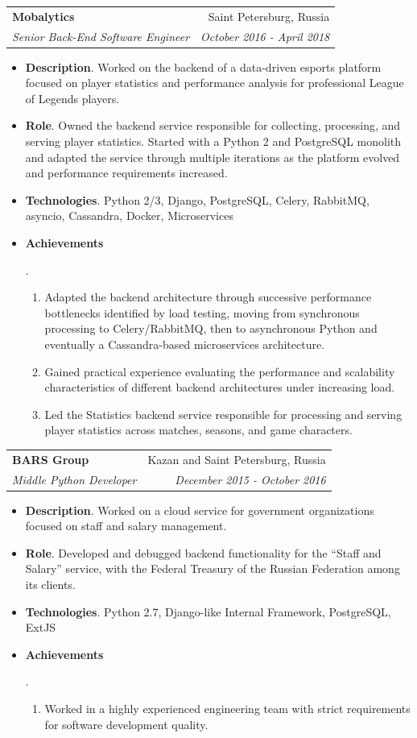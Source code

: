 \documentclass[letterpaper,11pt]{article}
\makeatletter
\newcommand{\resumeItem}[2]{
  \item\small{
    \textbf{#1}{. #2 \vspace{-2pt}}
  }
}
\newcommand{\resumeSubheading}[4]{
  \vspace{-1pt}\item
    \begin{tabular*}{0.97\textwidth}{l@{\extracolsep{\fill}}r}
      \textbf{#1} & #2 \\
      \textit{\small#3} & \textit{\small #4} \\
    \end{tabular*}\vspace{-5pt}
}
\newcommand{\resumeItemListStart}{\begin{itemize}}
\newcommand{\resumeItemListEnd}{\end{itemize}\vspace{-5pt}}
\makeatother
\begin{document}
    \resumeSubheading
      {Mobalytics}{Saint Petersburg, Russia}
      {Senior Back-End Software Engineer}{October 2016 - April 2018}
      \resumeItemListStart
        \resumeItem{Description}
          {Worked on the backend of a data-driven esports platform focused on player statistics and performance analysis for professional League of Legends players.}
        \resumeItem{Role}
          {Owned the backend service responsible for collecting, processing, and serving player statistics. Started with a Python 2 and PostgreSQL monolith and adapted the service through multiple iterations as the platform evolved and performance requirements increased.}
        \resumeItem{Technologies}
          {Python 2/3, Django, PostgreSQL, Celery, RabbitMQ, asyncio, Cassandra, Docker, Microservices}
        \resumeItem{Achievements}
          {
            \begin{enumerate}
              \item Adapted the backend architecture through successive performance bottlenecks identified by load testing, moving from synchronous processing to Celery/RabbitMQ, then to asynchronous Python and eventually a Cassandra-based microservices architecture.
              \item Gained practical experience evaluating the performance and scalability characteristics of different backend architectures under increasing load.
              \item Led the Statistics backend service responsible for processing and serving player statistics across matches, seasons, and game characters.
            \end{enumerate}
          }
      \resumeItemListEnd

      \resumeSubheading
      {BARS Group}{Kazan and Saint Petersburg, Russia}
      {Middle Python Developer}{December 2015 - October 2016}
      \resumeItemListStart
        \resumeItem{Description}
          {Worked on a cloud service for government organizations focused on staff and salary management.}
        \resumeItem{Role}
          {Developed and debugged backend functionality for the ``Staff and Salary'' service, with the Federal Treasury of the Russian Federation among its clients.}
        \resumeItem{Technologies}
          {Python 2.7, Django-like Internal Framework, PostgreSQL, ExtJS}
        \resumeItem{Achievements}
          {
            \begin{enumerate}
              \item Worked in a highly experienced engineering team with strict requirements for software development quality.
            \end{enumerate}
          }
      \resumeItemListEnd
\end{document}
